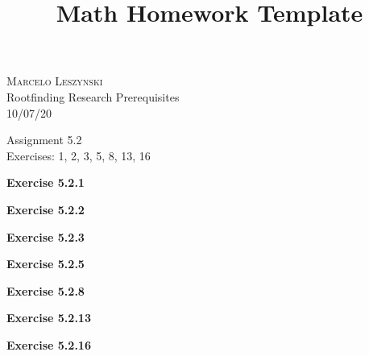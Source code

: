 \documentclass[12pt,oneside]{article}
\newenvironment{exercise}[1]{\vspace{.1in}\noindent\textbf{Exercise #1 \hspace{.05em}}}{}
\begin{document}
\title{Math Homework Template}

\begin{flushright}
\textsc{Marcelo Leszynski}  \\
Rootfinding Research Prerequisites\\
10/07/20
\end{flushright}

\begin{center}
\textsf{Assignment 5.2 } \\
\textsf{Exercises: 1, 2, 3, 5, 8, 13, 16 }
\end{center}


\begin{exercise}{5.2.1}

\end{exercise}


\begin{exercise}{5.2.2}

\end{exercise}


\begin{exercise}{5.2.3}

\end{exercise}


\begin{exercise}{5.2.5}

\end{exercise}


\begin{exercise}{5.2.8}

\end{exercise}


\begin{exercise}{5.2.13}

\end{exercise}


\begin{exercise}{5.2.16}

\end{exercise}


\end{document}
